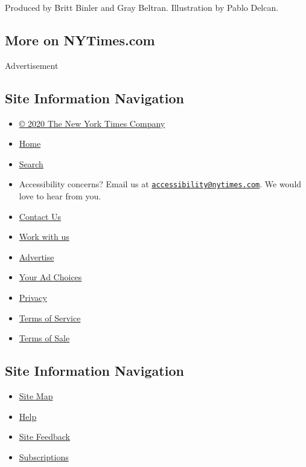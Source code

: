 Produced by Britt Binler and Gray Beltran. Illustration by Pablo Delcan.

\hypertarget{more-on-nytimescom}{%
\subsection{More on NYTimes.com}\label{more-on-nytimescom}}

Advertisement

\hypertarget{site-information-navigation}{%
\subsection{Site Information
Navigation}\label{site-information-navigation}}

\begin{itemize}
\tightlist
\item
  \href{https://help.nytimes.com/hc/en-us/articles/115014792127-Copyright-notice}{©
  2020 The New York Times Company}
\item
  \href{https://www.nytimes.com}{Home}
\item
  \href{https://www.nytimes.com/search/}{Search}
\item
  Accessibility concerns? Email us at
  \href{mailto:accessibility@nytimes.com}{\nolinkurl{accessibility@nytimes.com}}.
  We would love to hear from you.
\item
  \href{https://help.nytimes.com/hc/en-us/articles/115015385887-Contact-Us}{Contact
  Us}
\item
  \href{https://www.nytco.com/careers/}{Work with us}
\item
  \href{https://nytmediakit.com/}{Advertise}
\item
  \href{https://help.nytimes.com/hc/en-us/articles/115014892108-Privacy-policy\#pp}{Your
  Ad Choices}
\item
  \href{https://help.nytimes.com/hc/en-us/articles/115014892108-Privacy-policy}{Privacy}
\item
  \href{https://help.nytimes.com/hc/en-us/articles/115014893428-Terms-of-service}{Terms
  of Service}
\item
  \href{https://help.nytimes.com/hc/en-us/articles/115014893968-Terms-of-sale}{Terms
  of Sale}
\end{itemize}

\hypertarget{site-information-navigation-1}{%
\subsection{Site Information
Navigation}\label{site-information-navigation-1}}

\begin{itemize}
\tightlist
\item
  \href{https://spiderbites.nytimes.com}{Site Map}
\item
  \href{https://help.nytimes.com/hc/en-us}{Help}
\item
  \href{https://help.nytimes.com/hc/en-us/articles/115015385887-Contact-Us?redir=myacc}{Site
  Feedback}
\item
  \href{https://www.nytimes.com/subscription?campaignId=37WXW}{Subscriptions}
\end{itemize}
